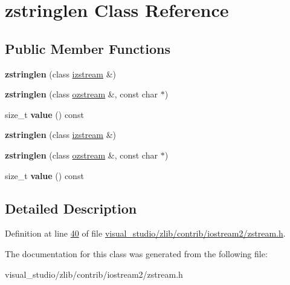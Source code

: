 \hypertarget{classzstringlen}{}\section{zstringlen Class Reference}
\label{classzstringlen}
\subsection*{Public Member Functions}
\begin{DoxyCompactItemize}
\item 
\mbox{\label{classzstringlen_ae616a813b06db3cabf2affabf3daab75}} 
{\bfseries zstringlen} (class \hyperlink{classizstream}{izstream} \&)
\item 
\mbox{\label{classzstringlen_adc39dd75c544f35a3c56f74b405602d2}} 
{\bfseries zstringlen} (class \hyperlink{classozstream}{ozstream} \&, const char $\ast$)
\item 
\mbox{\label{classzstringlen_a4027f6245694bc4ac5ca2f4719aa2982}} 
size\+\_\+t {\bfseries value} () const
\item 
\mbox{\label{classzstringlen_ae616a813b06db3cabf2affabf3daab75}} 
{\bfseries zstringlen} (class \hyperlink{classizstream}{izstream} \&)
\item 
\mbox{\label{classzstringlen_adc39dd75c544f35a3c56f74b405602d2}} 
{\bfseries zstringlen} (class \hyperlink{classozstream}{ozstream} \&, const char $\ast$)
\item 
\mbox{\label{classzstringlen_a4027f6245694bc4ac5ca2f4719aa2982}} 
size\+\_\+t {\bfseries value} () const
\end{DoxyCompactItemize}


\subsection{Detailed Description}


Definition at line \hyperlink{visual__studio_2zlib_2contrib_2iostream2_2zstream_8h_source_l00040}{40} of file \hyperlink{visual__studio_2zlib_2contrib_2iostream2_2zstream_8h_source}{visual\+\_\+studio/zlib/contrib/iostream2/zstream.\+h}.



The documentation for this class was generated from the following file\+:\begin{DoxyCompactItemize}
\item 
visual\+\_\+studio/zlib/contrib/iostream2/zstream.\+h\end{DoxyCompactItemize}
